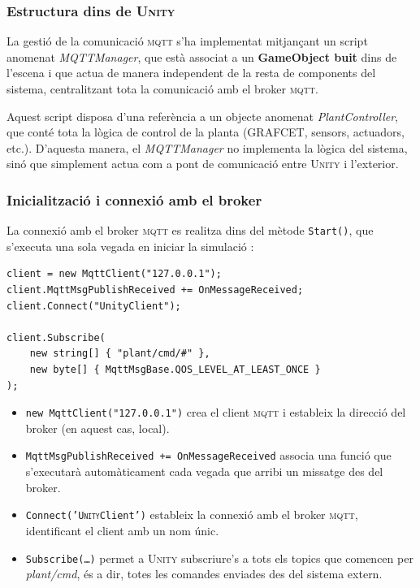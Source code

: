 \documentclass[a4paper,11pt,DIV=13,headings=normal,abstract=true,twoside=semi]{article}
\newcommand{\acro}[1]{\textsc{#1}}
\begin{document}
\subsubsection*{Estructura dins de \acro{Unity}}

La gestió de la comunicació \acro{mqtt} s'ha implementat mitjançant un script anomenat \emph{MQTTManager}, que està associat a un \textbf{GameObject buit} \cite{UnityGameObjects} dins de l'escena i que actua de manera independent de la resta de components del sistema, centralitzant tota la comunicació amb el broker \acro{mqtt}.

Aquest script disposa d'una referència a un objecte anomenat \emph{PlantController}, que conté tota la lògica de control de la planta (\acro{GRAFCET}, sensors, actuadors, etc.). D'aquesta manera, el \emph{MQTTManager} no implementa la lògica del sistema, sinó que simplement actua com a pont de comunicació entre \acro{Unity} i l'exterior.

\subsubsection*{Inicialització i connexió amb el broker}

La connexió amb el broker \acro{mqtt} es realitza dins del mètode \texttt{Start()}, que s'executa una sola vegada en iniciar la simulació \cite{mqtt_unity_guide}:

\begin{lstlisting}[style=simple]
client = new MqttClient("127.0.0.1");
client.MqttMsgPublishReceived += OnMessageReceived;
client.Connect("UnityClient");

client.Subscribe(
    new string[] { "plant/cmd/#" },
    new byte[] { MqttMsgBase.QOS_LEVEL_AT_LEAST_ONCE }
);
\end{lstlisting}


\begin{itemize}
    \item \texttt{new MqttClient("127.0.0.1")} crea el client \acro{mqtt} i estableix la direcció del broker (en aquest cas, local).
    
    \item \texttt{MqttMsgPublishReceived += OnMessageReceived} associa una funció que s'executarà automàticament cada vegada que arribi un missatge des del broker.
    
    \item \texttt{Connect('\acro{Unity}Client')} estableix la connexió amb el broker \acro{mqtt}, identificant el client amb un nom únic.
    
    \item \texttt{Subscribe(\dots)} permet a \acro{Unity} subscriure's a tots els topics que comencen per \emph{plant/cmd}, és a dir, totes les comandes enviades des del sistema extern.
\end{itemize}
\end{document}
